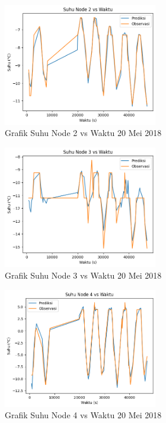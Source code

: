 \begin{figure}[H]
\setlength{}
\begin{center}
\includegraphics[width=0.6\textwidth]{fig/node2_temp_2018-05-20.png}
\caption{Grafik Suhu Node 2 vs Waktu 20 Mei 2018}
\label{fig:node220}
\end{center}
\end{figure}

\begin{figure}[H]
\setlength{}
\begin{center}
\includegraphics[width=0.6\textwidth]{fig/node3_temp_2018-05-20.png}
\caption{Grafik Suhu Node 3 vs Waktu 20 Mei 2018}
\label{fig:node320}
\end{center}
\end{figure}

\begin{figure}[H]
\setlength{}
\begin{center}
\includegraphics[width=0.6\textwidth]{fig/node4_temp_2018-05-20.png}
\caption{Grafik Suhu Node 4 vs Waktu 20 Mei 2018}
\label{fig:node420}
\end{center}
\end{figure}

